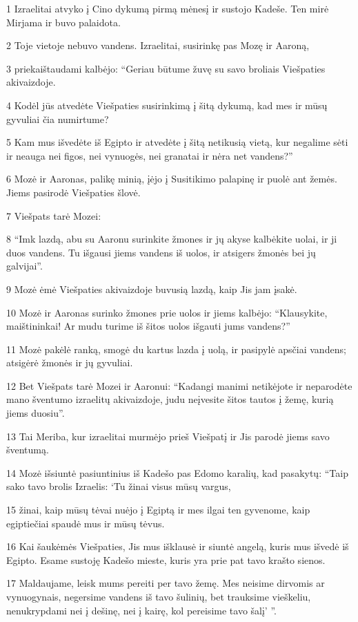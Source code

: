 \par 1 Izraelitai atvyko į Cino dykumą pirmą mėnesį ir sustojo Kadeše. Ten mirė Mirjama ir buvo palaidota. 
\par 2 Toje vietoje nebuvo vandens. Izraelitai, susirinkę pas Mozę ir Aaroną, 
\par 3 priekaištaudami kalbėjo: “Geriau būtume žuvę su savo broliais Viešpaties akivaizdoje. 
\par 4 Kodėl jūs atvedėte Viešpaties susirinkimą į šitą dykumą, kad mes ir mūsų gyvuliai čia numirtume? 
\par 5 Kam mus išvedėte iš Egipto ir atvedėte į šitą netikusią vietą, kur negalime sėti ir neauga nei figos, nei vynuogės, nei granatai ir nėra net vandens?” 
\par 6 Mozė ir Aaronas, palikę minią, įėjo į Susitikimo palapinę ir puolė ant žemės. Jiems pasirodė Viešpaties šlovė. 
\par 7 Viešpats tarė Mozei: 
\par 8 “Imk lazdą, abu su Aaronu surinkite žmones ir jų akyse kalbėkite uolai, ir ji duos vandens. Tu išgausi jiems vandens iš uolos, ir atsigers žmonės bei jų galvijai”. 
\par 9 Mozė ėmė Viešpaties akivaizdoje buvusią lazdą, kaip Jis jam įsakė. 
\par 10 Mozė ir Aaronas surinko žmones prie uolos ir jiems kalbėjo: “Klausykite, maištininkai! Ar mudu turime iš šitos uolos išgauti jums vandens?” 
\par 11 Mozė pakėlė ranką, smogė du kartus lazda į uolą, ir pasipylė apsčiai vandens; atsigėrė žmonės ir jų gyvuliai. 
\par 12 Bet Viešpats tarė Mozei ir Aaronui: “Kadangi manimi netikėjote ir neparodėte mano šventumo izraelitų akivaizdoje, judu neįvesite šitos tautos į žemę, kurią jiems duosiu”. 
\par 13 Tai Meriba, kur izraelitai murmėjo prieš Viešpatį ir Jis parodė jiems savo šventumą. 
\par 14 Mozė išsiuntė pasiuntinius iš Kadešo pas Edomo karalių, kad pasakytų: “Taip sako tavo brolis Izraelis: ‘Tu žinai visus mūsų vargus, 
\par 15 žinai, kaip mūsų tėvai nuėjo į Egiptą ir mes ilgai ten gyvenome, kaip egiptiečiai spaudė mus ir mūsų tėvus. 
\par 16 Kai šaukėmės Viešpaties, Jis mus išklausė ir siuntė angelą, kuris mus išvedė iš Egipto. Esame sustoję Kadešo mieste, kuris yra prie pat tavo krašto sienos. 
\par 17 Maldaujame, leisk mums pereiti per tavo žemę. Mes neisime dirvomis ar vynuogynais, negersime vandens iš tavo šulinių, bet trauksime vieškeliu, nenukrypdami nei į dešinę, nei į kairę, kol pereisime tavo šalį’ ”. 
